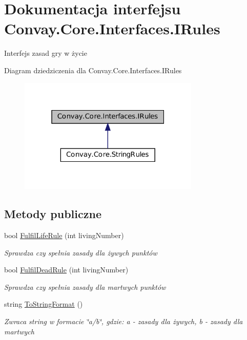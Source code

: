 \hypertarget{interface_convay_1_1_core_1_1_interfaces_1_1_i_rules}{}\section{Dokumentacja interfejsu Convay.\+Core.\+Interfaces.\+I\+Rules}
\label{interface_convay_1_1_core_1_1_interfaces_1_1_i_rules}


Interfejs zasad gry w życie  




Diagram dziedziczenia dla Convay.\+Core.\+Interfaces.\+I\+Rules
\nopagebreak
\begin{figure}[H]
\begin{center}
\leavevmode
\includegraphics[width=244pt]{interface_convay_1_1_core_1_1_interfaces_1_1_i_rules__inherit__graph}
\end{center}
\end{figure}
\subsection*{Metody publiczne}
\begin{DoxyCompactItemize}
\item 
bool \hyperlink{interface_convay_1_1_core_1_1_interfaces_1_1_i_rules_ad184ed56601ab383d06db323a83fa48e}{Fulfil\+Life\+Rule} (int living\+Number)
\begin{DoxyCompactList}\small\item\em Sprawdza czy spełnia zasady dla żywych punktów \end{DoxyCompactList}\item 
bool \hyperlink{interface_convay_1_1_core_1_1_interfaces_1_1_i_rules_a180f2cc36d8f7db4407f679c18cf51b6}{Fulfil\+Dead\+Rule} (int living\+Number)
\begin{DoxyCompactList}\small\item\em Sprawdza czy spełnia zasady dla martwych punktów \end{DoxyCompactList}\item 
string \hyperlink{interface_convay_1_1_core_1_1_interfaces_1_1_i_rules_a7863e051cf9285ab1ef5b888c74d5018}{To\+String\+Format} ()
\begin{DoxyCompactList}\small\item\em Zwraca string w formacie \char`\"{}a/b\char`\"{}, gdzie\+: a -\/ zasady dla żywych, b -\/ zasady dla martwych \end{DoxyCompactList}\end{DoxyCompactItemize}


